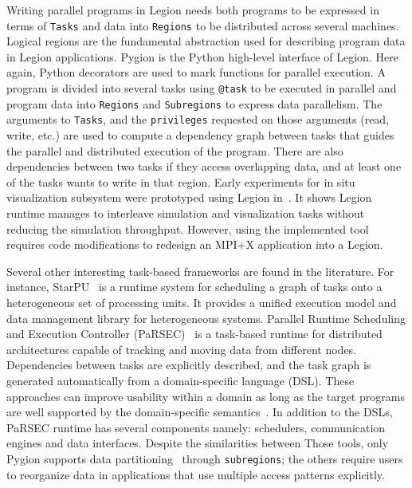 Writing parallel programs in Legion\cite{bauer_legion_2012} needs both programs to be expressed in terms of \texttt{Tasks} and data into \texttt{Regions} to be distributed across several machines. Logical regions are the fundamental abstraction used for describing program data in Legion applications. 
Pygion\cite{slaughter_pygion_2019} is the Python high-level interface of Legion. Here again, Python decorators are used to mark functions for parallel execution. A program is divided into several tasks using \texttt{@task} to be executed in parallel and program data into \texttt{Regions} and \texttt{Subregions} to express data parallelism. 
The arguments to \texttt{Tasks}, and the \texttt{privileges} requested on those arguments (read, write, etc.) are used to compute a dependency graph between tasks that guides the parallel and distributed execution of the program. There are also dependencies between two tasks if they access overlapping data, and at least one of the tasks wants to write in that region.  
Early experiments for in situ visualization subsystem were prototyped using Legion in~\cite{heirich2017situ}.  
It shows Legion runtime manages to interleave simulation and visualization tasks without reducing the simulation throughput. However, using the implemented tool requires code modifications to redesign an MPI+X application into a Legion.

Several other interesting task-based frameworks are found in the literature. For instance,  
StarPU~\cite{augonnet2009starpu, augonnet2010starpu, archipoff2017starpu} is a runtime system for scheduling a graph of tasks onto a heterogeneous set of processing units. It provides a unified execution model and data management library for heterogeneous systems.
Parallel Runtime Scheduling and Execution Controller (PaRSEC)~\cite{bosilca2013parsec, hoque2017dynamic} is a task-based runtime for distributed architectures capable of tracking and moving data from different nodes. Dependencies between tasks are explicitly described, and the task graph is generated automatically from a domain-specific language (DSL). These approaches can improve usability within a domain as long as the target programs are well supported by the domain-specific semantics~\cite{slaughter_pygion_2019}. In addition to the DSLs, PaRSEC runtime has several components namely: schedulers, communication engines and data interfaces. 
Despite the similarities between Those tools, only Pygion supports data partitioning~\cite{treichler2016dependent_partitioning} through \texttt{subregions}; the others require users to reorganize data in applications that use multiple access patterns explicitly. 


